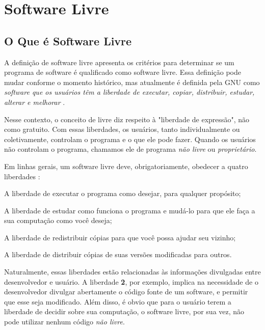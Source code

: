 


\chapter{Software Livre}
\label{chap:SoftwareLivre}

\section{O Que é Software Livre}

A definição de software livre apresenta os critérios para determinar se um programa de software é qualificado como software livre. Essa definição pode mudar conforme o momento histórico, mas atualmente é definida pela GNU como \textit{software que os usuários têm a liberdade de executar, copiar, distribuir, estudar, alterar e melhorar} \cite{Inc2012} . 

Nesse contexto, o conceito de livre diz respeito à "liberdade de expressão", não como gratuito. Com essas liberdades, os usuários, tanto individualmente ou coletivamente, controlam o programa e o que ele pode fazer. Quando os usuários não controlam o programa, chamamos ele de programa \textit{não livre} ou \textit{proprietário}. 

Em linhas gerais, um software livre deve, obrigatoriamente, obedecer a quatro liberdades \cite{Inc2012, Williams, Lessig2002} :
\begin{compactenum}
	\item A liberdade de executar o programa como desejar, para qualquer propósito;
	\item A liberdade de estudar como funciona o programa e mudá-lo para que ele faça a sua computação como você deseja;
	\item A liberdade de redistribuir cópias para que você possa ajudar seu vizinho;
	\item A liberdade de distribuir cópias de suas versões modificadas para outros.
\end{compactenum}

Naturalmente, essas liberdades estão relacionadas às informações divulgadas entre desenvolvedor e usuário. A liberdade \textbf{2}, por exemplo, implica na necessidade de o desenvolvedor divulgar abertamente o código fonte de um software, e permitir que esse seja modificado. Além disso, é obvio que para o usuário terem a liberdade de decidir sobre sua computação, o software livre, por sua vez, não pode utilizar nenhum código \textit{não livre}.

